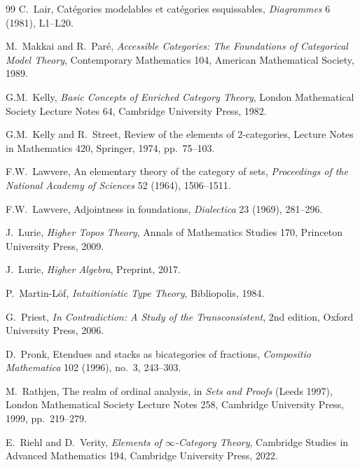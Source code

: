 \documentclass[11pt]{article}
\theoremstyle{plain}
\theoremstyle{definition}
\begin{document}
\begin{thebibliography}{99}
C.~Lair,
\newblock Cat\'egories modelables et cat\'egories esquissables,
\newblock \emph{Diagrammes} 6 (1981), L1--L20.

M.~Makkai and R.~Par\'e,
\newblock \emph{Accessible Categories: The Foundations of Categorical Model Theory},
\newblock Contemporary Mathematics 104, American Mathematical Society, 1989.

G.M.~Kelly,
\newblock \emph{Basic Concepts of Enriched Category Theory},
\newblock London Mathematical Society Lecture Notes 64, Cambridge University Press, 1982.

G.M.~Kelly and R.~Street,
\newblock Review of the elements of $2$-categories,
\newblock Lecture Notes in Mathematics 420, Springer, 1974, pp.~75--103.

F.W.~Lawvere,
\newblock An elementary theory of the category of sets,
\newblock \emph{Proceedings of the National Academy of Sciences} 52 (1964), 1506--1511.

F.W.~Lawvere,
\newblock Adjointness in foundations,
\newblock \emph{Dialectica} 23 (1969), 281--296.

J.~Lurie,
\newblock \emph{Higher Topos Theory},
\newblock Annals of Mathematics Studies 170, Princeton University Press, 2009.

J.~Lurie,
\newblock \emph{Higher Algebra},
\newblock Preprint, 2017.

P.~Martin-L\"of,
\newblock \emph{Intuitionistic Type Theory},
\newblock Bibliopolis, 1984.

G.~Priest,
\newblock \emph{In Contradiction: A Study of the Transconsistent},
\newblock 2nd edition, Oxford University Press, 2006.

D.~Pronk,
\newblock Etendues and stacks as bicategories of fractions,
\newblock \emph{Compositio Mathematica} 102 (1996), no.~3, 243--303.

M.~Rathjen,
\newblock The realm of ordinal analysis,
\newblock in \emph{Sets and Proofs} (Leeds 1997), London Mathematical Society Lecture Notes 258, Cambridge University Press, 1999, pp.~219--279.

E.~Riehl and D.~Verity,
\newblock \emph{Elements of $\infty$-Category Theory},
\newblock Cambridge Studies in Advanced Mathematics 194, Cambridge University Press, 2022.


\end{thebibliography}
\end{document}
